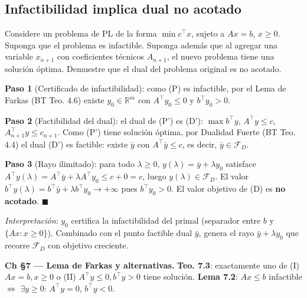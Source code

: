 \documentclass[12pt]{article}
\theoremstyle{plain}
\begin{document}
\bigskip

\subsection{Infactibilidad implica dual no acotado}

Considere un problema de PL de la forma $\min c^\top x$, sujeto a $Ax = b$, $x \geq 0$.
Suponga que el problema es infactible. Suponga además que al agregar una variable $x_{n+1}$
con coeficientes técnicos $A_{n+1}$, el nuevo problema tiene una solución óptima. Demuestre
que el dual del problema original es no acotado.

\begin{solucion}

\textbf{Paso 1} (Certificado de infactibilidad): como (P) es infactible, por el Lema de Farkas (BT Teo. 4.6) existe $y_0\in\mathbb{R}^m$ con $A^\top y_0\leq 0$ y $b^\top y_0>0$.

\textbf{Paso 2} (Factibilidad del dual): el dual de (P') es (D'): $\max b^\top y$, $A^\top y\leq c$, $A_{n+1}^\top y\leq c_{n+1}$. Como (P') tiene solución óptima, por Dualidad Fuerte (BT Teo. 4.4) el dual (D') es factible: existe $\bar{y}$ con $A^\top\bar{y}\leq c$, es decir, $\bar{y}\in\mathcal{F}_D$.

\textbf{Paso 3} (Rayo ilimitado): para todo $\lambda\geq 0$, $y(\lambda)=\bar{y}+\lambda y_0$ satisface $A^\top y(\lambda)=A^\top\bar{y}+\lambda A^\top y_0\leq c+0=c$, luego $y(\lambda)\in\mathcal{F}_D$. El valor $b^\top y(\lambda)=b^\top\bar{y}+\lambda b^\top y_0\to+\infty$ pues $b^\top y_0>0$. El valor objetivo de (D) es \textbf{no acotado}. $\blacksquare$

\textit{Interpretación}: $y_0$ certifica la infactibilidad del primal (separador entre $b$ y $\{Ax:x\geq 0\}$). Combinado con el punto factible dual $\bar{y}$, genera el rayo $\bar{y}+\lambda y_0$ que recorre $\mathcal{F}_D$ con objetivo creciente.

\end{solucion}

\begin{teofund}
\textbf{Ch §7 — Lema de Farkas y alternativas.} \textbf{Teo. 7.3}: exactamente uno de (I) $Ax=b,x\geq 0$ o (II) $A^\top y\leq 0,b^\top y>0$ tiene solución. \textbf{Lema 7.2}: $Ax\leq b$ infactible $\Leftrightarrow$ $\exists y\geq 0$: $A^\top y=0$, $b^\top y<0$.
\end{teofund}
\end{document}
